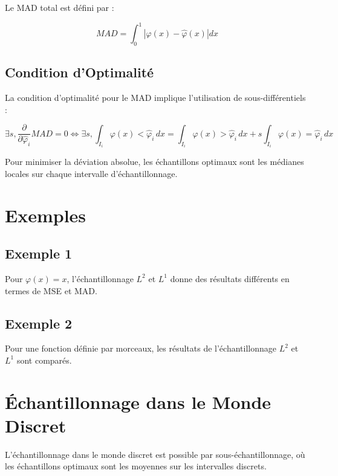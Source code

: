 \documentclass[12pt]{article}
\begin{document}
Le MAD total est défini par :

\begin{equation}
MAD = \int_0^1 |\varphi(x) - \hat{\varphi}(x)| dx
\end{equation}

\subsection{Condition d'Optimalité}

La condition d'optimalité pour le MAD implique l'utilisation de sous-différentiels :

\begin{equation}
\exists s, \frac{\partial}{\partial \hat{\varphi}_i} MAD = 0 \iff \exists s, \int_{I_i} \varphi(x) < \hat{\varphi}_i \, dx = \int_{I_i} \varphi(x) > \hat{\varphi}_i \, dx + s \int_{I_i} \varphi(x) = \hat{\varphi}_i \, dx
\end{equation}

\begin{tcolorbox}[title={Vulgarisation simple}]
Pour minimiser la déviation absolue, les échantillons optimaux sont les médianes locales sur chaque intervalle d'échantillonnage.
\end{tcolorbox}

\section{Exemples}

\subsection{Exemple 1}

Pour $\varphi(x) = x$, l'échantillonnage $L^2$ et $L^1$ donne des résultats différents en termes de MSE et MAD.


\subsection{Exemple 2}

Pour une fonction définie par morceaux, les résultats de l'échantillonnage $L^2$ et $L^1$ sont comparés.


\section{Échantillonnage dans le Monde Discret}

L'échantillonnage dans le monde discret est possible par sous-échantillonnage, où les échantillons optimaux sont les moyennes sur les intervalles discrets.

\end{document}
